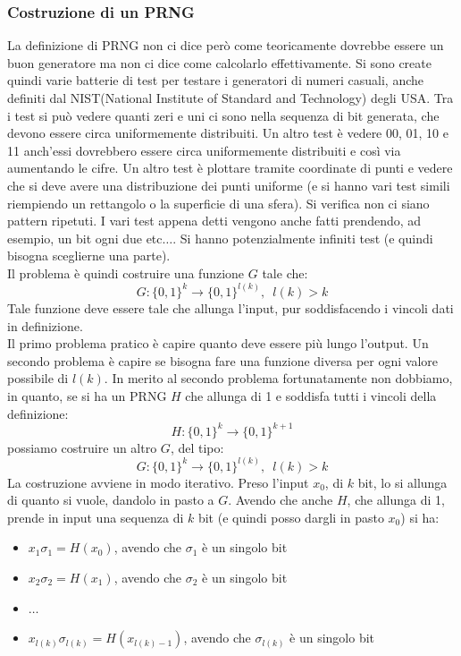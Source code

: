 \documentclass[a4paper,12pt, oneside]{book}
\begin{document}
\subsubsection{Costruzione di un PRNG}
La definizione di PRNG non ci dice però come teoricamente dovrebbe essere un
buon generatore ma non ci dice come calcolarlo effettivamente. Si sono create
quindi varie batterie di test per testare i generatori di numeri casuali, anche
definiti dal NIST(National Institute of Standard and Technology) degli USA. Tra
i test si può vedere quanti zeri e uni ci sono nella sequenza di bit generata,
che devono essere circa uniformemente distribuiti. Un altro test è vedere 00,
01, 10 e 11 anch'essi dovrebbero essere circa uniformemente distribuiti e così
via aumentando le cifre. Un altro test è plottare tramite coordinate di punti e
vedere che si deve avere una distribuzione dei punti uniforme (e si hanno vari
test simili riempiendo un rettangolo o la superficie di una sfera). Si verifica
non ci siano pattern ripetuti. I vari test appena detti vengono anche fatti
prendendo, ad esempio, un bit ogni due etc$\ldots$. Si hanno potenzialmente
infiniti test (e quindi bisogna sceglierne una parte). \\
Il problema è quindi costruire una funzione $G$ tale che:
\[G:\{0,1\}^k\to\{0,1\}^{l(k)},\,\,\,l(k)>k\]
Tale funzione deve essere tale che allunga l'input, pur soddisfacendo i vincoli
dati in definizione.\\
Il primo problema pratico è capire quanto deve essere più lungo l'output. Un
secondo problema è capire se bisogna fare una funzione diversa per ogni valore
possibile di $l(k)$. In merito al secondo problema fortunatamente non dobbiamo,
in quanto, se si ha un PRNG $H$ che allunga di 1 e soddisfa tutti i vincoli
della definizione:
\[H:\{0,1\}^k\to\{0,1\}^{k+1}\]
possiamo costruire un altro $G$, del tipo:
\[G:\{0,1\}^k\to\{0,1\}^{l(k)},\,\,\,l(k)>k\]
La costruzione avviene in modo iterativo. Preso l'input $x_0$, di $k$ bit, lo si
allunga di quanto si vuole, dandolo in pasto a $G$. Avendo che anche $H$, che
allunga di 1, prende
in input una sequenza di $k$ bit (e quindi posso dargli in pasto $x_0$) si ha:
\begin{itemize}
  \item $x_1\sigma_1=H(x_0)$, avendo che $\sigma_1$ è un singolo bit
  \item $x_2\sigma_2=H(x_1)$, avendo che $\sigma_2$ è un singolo bit
  \item $\ldots$
  \item $x_{l(k)}\sigma_{l(k)}=H(x_{l(k)-1})$, avendo che $\sigma_{l(k)}$ è un
  singolo bit  
\end{itemize}
\end{document}
